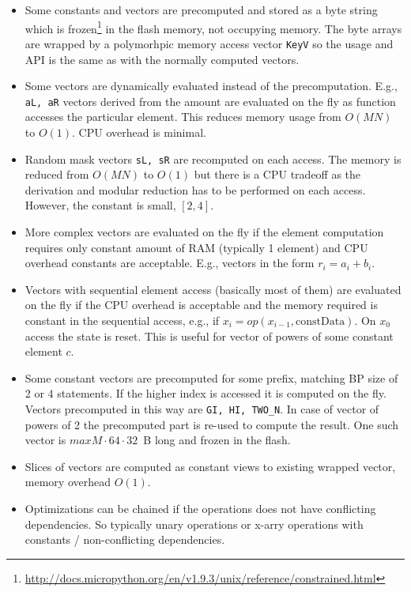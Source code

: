 \documentclass[]{article}
\begin{document}
\begin{itemize}
	\item Some constants and vectors are precomputed and stored as a byte string which is frozen\footnote{\url{http://docs.micropython.org/en/v1.9.3/unix/reference/constrained.html}} in the flash memory, not occupying memory. The byte arrays are wrapped by a polymorhpic memory access vector \verb|KeyV| so the usage and API is the same as with the normally computed vectors.
	
	\item Some vectors are dynamically evaluated instead of the precomputation. E.g., \verb|aL, aR| vectors derived from the amount are evaluated on the fly as function accesses the particular element. This reduces memory usage from $O(MN)$ to $O(1)$. CPU overhead is minimal.
	
	\item Random mask vectors \verb|sL, sR| are recomputed on each access. The memory is reduced from $O(MN)$ to $O(1)$ but there is a CPU tradeoff as the derivation and modular reduction has to be performed on each access. However, the constant is small, $[2,4]$.
	
	\item More complex vectors are evaluated on the fly if the element computation requires only constant amount  of RAM (typically 1 element) and CPU overhead constants are acceptable. E.g., vectors in the form $r_i=a_i+b_i$. 
	
	\item Vectors with sequential element access (basically most of them) are evaluated on the fly if the CPU overhead is acceptable and the memory required is constant in the sequential access, e.g., if $x_i = op(x_{i-1}, \text{constData})$. On $x_0$ access the state is reset. This is useful for vector of powers of some constant element $c$.
	
	\item Some constant vectors are precomputed for some prefix, matching BP size of 2 or 4 statements. If the higher index is accessed it is computed on the fly. Vectors precomputed in this way are \verb|GI, HI, TWO_N|. In case of vector of powers of 2 the precomputed part is re-used to compute the result. One such vector is $maxM \cdot 64\cdot32$~B long and frozen in the flash.
	
	\item Slices of vectors are computed as constant views to existing wrapped vector, memory overhead $O(1)$.
	
	\item Optimizations can be chained if the operations does not have conflicting dependencies. So typically unary operations or x-arry operations with constants / non-conflicting dependencies.
	
\end{itemize}
\end{document}
